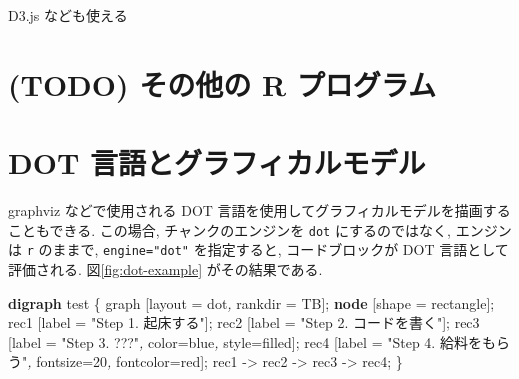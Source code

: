 \documentclass[
  xelatex,ja=standard,jafont=noto]{bxjsbook}
\newenvironment{Shaded}{\begin{snugshade}}{\end{snugshade}}
\newcommand{\AttributeTok}[1]{\textcolor[rgb]{0.77,0.63,0.00}{#1}}
\newcommand{\CommentTok}[1]{\textcolor[rgb]{0.56,0.35,0.01}{\textit{#1}}}
\newcommand{\DecValTok}[1]{\textcolor[rgb]{0.00,0.00,0.81}{#1}}
\newcommand{\KeywordTok}[1]{\textcolor[rgb]{0.13,0.29,0.53}{\textbf{#1}}}
\newcommand{\OtherTok}[1]{\textcolor[rgb]{0.56,0.35,0.01}{#1}}
\newcommand{\StringTok}[1]{\textcolor[rgb]{0.31,0.60,0.02}{#1}}
\newcommand{\VariableTok}[1]{\textcolor[rgb]{0.00,0.00,0.00}{#1}}
\theoremstyle{definition}
\theoremstyle{definition}
\theoremstyle{definition}
\theoremstyle{definition}
\theoremstyle{remark}
\begin{document}
D3.js なども使える

\hypertarget{todo-ux305dux306eux4ed6ux306e-r-ux30d7ux30edux30b0ux30e9ux30e0}{%
\section{(TODO) その他の R
プログラム}\label{todo-ux305dux306eux4ed6ux306e-r-ux30d7ux30edux30b0ux30e9ux30e0}}

\hypertarget{dot-ux8a00ux8a9eux3068ux30b0ux30e9ux30d5ux30a3ux30abux30ebux30e2ux30c7ux30eb}{%
\section{DOT
言語とグラフィカルモデル}\label{dot-ux8a00ux8a9eux3068ux30b0ux30e9ux30d5ux30a3ux30abux30ebux30e2ux30c7ux30eb}}

graphviz などで使用される DOT
言語を使用してグラフィカルモデルを描画することもできる. この場合,
チャンクのエンジンを \texttt{dot} にするのではなく, エンジンは
\texttt{r} のままで, \texttt{engine="dot"} を指定すると,
コードブロックが DOT 言語として評価される. 図\ref{fig:dot-example}
がその結果である.

\begin{Shaded}
\begin{Highlighting}[numbers=left,,]
\KeywordTok{digraph} \VariableTok{test} \OtherTok{\{}
\CommentTok{  }\VariableTok{graph}\CommentTok{ }\OtherTok{[}\VariableTok{layout}\CommentTok{ }\OtherTok{=}\CommentTok{ }\VariableTok{dot}\CommentTok{, }\AttributeTok{rankdir}\CommentTok{ }\OtherTok{=}\CommentTok{ }\VariableTok{TB}\OtherTok{];}
\CommentTok{  }\KeywordTok{node}\CommentTok{ }\OtherTok{[}\AttributeTok{shape}\CommentTok{ }\OtherTok{=}\CommentTok{ }\VariableTok{rectangle}\OtherTok{];}
\CommentTok{  }\VariableTok{rec1}\CommentTok{ }\OtherTok{[}\AttributeTok{label}\CommentTok{ }\OtherTok{=}\CommentTok{ }\StringTok{"Step 1. 起床する"}\OtherTok{];}
\CommentTok{  }\VariableTok{rec2}\CommentTok{ }\OtherTok{[}\AttributeTok{label}\CommentTok{ }\OtherTok{=}\CommentTok{ }\StringTok{"Step 2. コードを書く"}\OtherTok{];}
\CommentTok{  }\VariableTok{rec3}\CommentTok{ }\OtherTok{[}\AttributeTok{label}\CommentTok{ }\OtherTok{=}\CommentTok{ }\StringTok{"Step 3. ???"}\CommentTok{, }\AttributeTok{color}\OtherTok{=}\VariableTok{blue}\CommentTok{, }\AttributeTok{style}\OtherTok{=}\VariableTok{filled}\OtherTok{];}
\CommentTok{  }\VariableTok{rec4}\CommentTok{ }\OtherTok{[}\AttributeTok{label}\CommentTok{ }\OtherTok{=}\CommentTok{ }\StringTok{"Step 4. 給料をもらう"}\CommentTok{, }\AttributeTok{fontsize}\OtherTok{=}\DecValTok{20}\CommentTok{, }\AttributeTok{fontcolor}\OtherTok{=}\VariableTok{red}\OtherTok{];}
\CommentTok{  }\VariableTok{rec1}\CommentTok{ }\OtherTok{{-}\textgreater{}}\CommentTok{ }\VariableTok{rec2}\CommentTok{ }\OtherTok{{-}\textgreater{}}\CommentTok{ }\VariableTok{rec3}\CommentTok{ }\OtherTok{{-}\textgreater{}}\CommentTok{ }\VariableTok{rec4}\OtherTok{;}
\CommentTok{  }\OtherTok{\}}
\end{Highlighting}
\end{Shaded}
\end{document}
